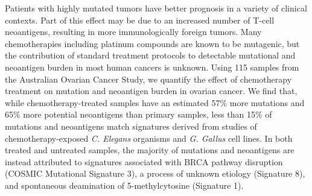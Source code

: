 Patients with highly mutated tumors have better prognosis in a variety of clinical contexts. Part of this effect may be due to an increased number of T-cell neoantigens, resulting in more immunologically foreign tumors. Many chemotherapies including platinum compounds are known to be mutagenic, but the contribution of standard treatment protocols to detectable mutational and neoantigen burden in most human cancers is unknown. Using 115 samples from the Australian Ovarian Cancer Study, we quantify the effect of chemotherapy treatment on mutation and neoantigen burden in ovarian cancer. We find that, while chemotherapy-treated samples have an estimated 57\% more mutations and 65\% more potential neoantigens than primary samples, less than 15\% of mutations and neoantigens match signatures derived from studies of chemotherapy-exposed \textit{C. Elegans} organisms and \textit{G. Gallus} cell lines. In both treated and untreated samples, the majority of mutations and neoantigens are instead attributed to signatures associated with BRCA pathway disruption (COSMIC Mutational Signature 3), a process of unknown etiology (Signature 8), and spontaneous deamination of 5-methylcytosine (Signature 1).


